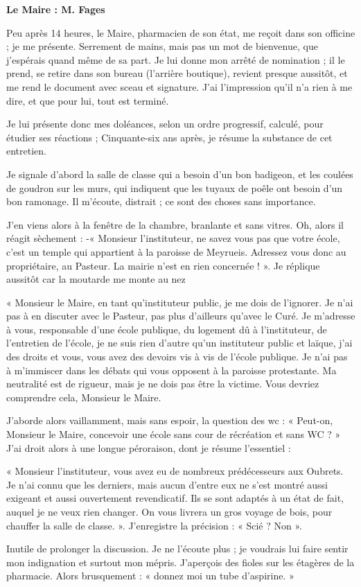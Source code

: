 
\textbf{Le Maire : M. Fages}

Peu après 14 heures, le Maire, pharmacien de son état, me reçoit dans son officine ; je
me présente. Serrement de mains, mais pas un mot de bienvenue, que j’espérais
quand même de sa part. Je lui donne mon arrêté de nomination ; il le prend, se retire
dans son bureau (l’arrière boutique), revient presque aussitôt, et me rend le document
avec sceau et signature. J’ai l’impression qu’il n’a rien à me dire, et que pour lui, tout
est terminé.

Je lui présente donc mes doléances, selon un ordre progressif, calculé, pour étudier
ses réactions ; Cinquante-six ans après, je résume la substance de cet entretien.

Je signale d’abord la salle de classe qui a besoin d’un bon badigeon, et les coulées de
goudron sur les murs, qui indiquent que les tuyaux de poêle ont besoin d’un bon
ramonage. Il m’écoute, distrait ; ce sont des choses sans importance.

J’en viens alors à la fenêtre de la chambre, branlante et sans vitres. Oh, alors il réagit
sèchement :
-« Monsieur l’instituteur, ne savez vous pas que votre école, c’est un temple qui
appartient à la paroisse de Meyrueis. Adressez vous donc au propriétaire, au Pasteur.
La mairie n’est en rien concernée ! ».
Je réplique aussitôt car la moutarde me monte au nez

« Monsieur le Maire, en tant qu’instituteur public, je me dois de l’ignorer. Je n’ai pas
à en discuter avec le Pasteur, pas plus d’ailleurs qu’avec le Curé. Je m’adresse à
vous, responsable d’une école publique, du logement dû à l’instituteur, de l’entretien
de l’école, je ne suis rien d’autre qu’un instituteur public et laïque, j’ai des droits et
vous, vous avez des devoirs vis à vis de l’école publique. Je n’ai pas à m’immiscer
dans les débats qui vous opposent à la paroisse protestante. Ma neutralité est de
rigueur, mais je ne dois pas être la victime. Vous devriez comprendre cela, Monsieur
le Maire.

J’aborde alors vaillamment, mais sans espoir, la question des wc :
« Peut-on, Monsieur le Maire, concevoir une école sans cour de récréation et sans
WC ? »
J’ai droit alors à une longue péroraison, dont je résume l’essentiel :

« Monsieur l’instituteur, vous avez eu de nombreux prédécesseurs aux Oubrets. Je
n’ai connu que les derniers, mais aucun d’entre eux ne s’est montré aussi exigeant et
aussi ouvertement revendicatif. Ils se sont adaptés à un état de fait, auquel je ne veux
rien changer.
On vous livrera un gros voyage de bois, pour chauffer la salle de classe. ».
J’enregistre la précision : « Scié ? Non ».

Inutile de prolonger la discussion. Je ne l’écoute plus ; je voudrais lui faire sentir mon
indignation et surtout mon mépris. J’aperçois des fioles sur les étagères de la
pharmacie. Alors brusquement :
« donnez moi un tube d’aspirine. »
